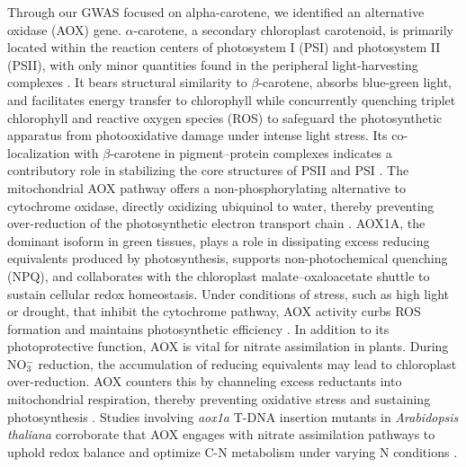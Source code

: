 \documentclass[10pt,letterpaper]{article}
\begin{document}
\begin{itemize}
Through our GWAS focused on alpha-carotene, we  identified an alternative oxidase (AOX) gene. \(\alpha\)-carotene, a secondary chloroplast carotenoid, is primarily located within the reaction centers of photosystem I (PSI) and photosystem II (PSII), with only minor quantities found in the peripheral light-harvesting complexes \citep{Young1989}. It bears structural similarity to \(\beta\)-carotene, absorbs blue-green light, and facilitates energy transfer to chlorophyll while concurrently quenching triplet chlorophyll and reactive oxygen species (ROS) to safeguard the photosynthetic apparatus from photooxidative damage under intense light stress. Its co-localization with \(\beta\)-carotene in pigment–protein complexes indicates a contributory role in stabilizing the core structures of PSII and PSI \citep{Young1989}. The mitochondrial AOX pathway offers a non-phosphorylating alternative to cytochrome oxidase, directly oxidizing ubiquinol to water, thereby preventing over-reduction of the photosynthetic electron transport chain \citep{Vishwakarma2015}. AOX1A, the dominant isoform in green tissues, plays a role in dissipating excess reducing equivalents produced by photosynthesis, supports non-photochemical quenching (NPQ), and collaborates with the chloroplast malate–oxaloacetate shuttle to sustain cellular redox homeostasis. Under conditions of stress, such as high light or drought, that inhibit the cytochrome pathway, AOX activity curbs ROS formation and maintains photosynthetic efficiency \citep{Vishwakarma2015}. In addition to its photoprotective function, AOX is vital for nitrate assimilation in plants. During NO\(_3^-\) reduction, the accumulation of reducing equivalents may lead to chloroplast over-reduction. AOX counters this by channeling excess reductants into mitochondrial respiration, thereby preventing oxidative stress and sustaining photosynthesis \citep{Gandin2014}. Studies involving \textit{aox1a} T-DNA insertion mutants in \emph{Arabidopsis thaliana} corroborate that AOX engages with nitrate assimilation pathways to uphold redox balance and optimize C-N metabolism under varying N conditions \citep{Gandin2014,Vishwakarma2015}.



\end{itemize}
\end{document}
